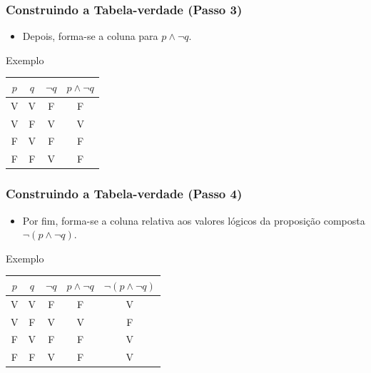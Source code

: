 \documentclass[aspectratio=169]{beamer} %
\begin{document}
\begin{frame}
\frametitle{Construindo a Tabela-verdade (Passo 3)}

\begin{itemize}
	\item Depois, forma-se a coluna para $p \wedge \neg q$.
\end{itemize}\vfill

\begin{exampleblock}{Exemplo}
	\center
	\begin{tabular}{|c|c|c|c|}
		\hline
		$p$ & $q$ & $\neg q$  &  $p \wedge \neg q$ \\ \hline
		V & V  & F & F\\ \hline
		V & F  & V & V\\ \hline
		F & V  & F & F\\ \hline
		F & F  & V & F\\ \hline
	\end{tabular}
\end{exampleblock}
\end{frame}

\begin{frame}
\frametitle{Construindo a Tabela-verdade (Passo 4)}

\begin{itemize}
	\item Por fim, forma-se a coluna relativa aos valores lógicos da proposição composta $\neg (p \wedge \neg q)$.
\end{itemize}\vfill

\begin{exampleblock}{Exemplo}
	\center
	\begin{tabular}{|c|c|c|c|c|}
		\hline
		$p$ & $q$ & $\neg q$  &  $p \wedge \neg q$ & $\neg (p \wedge \neg q)$\\ \hline
		V & V  & F & F & V\\ \hline
		V & F  & V & V & F\\ \hline
		F & V  & F & F & V\\ \hline
		F & F  & V & F& V\\ \hline
	\end{tabular}
\end{exampleblock}
\end{frame}
\end{document}
